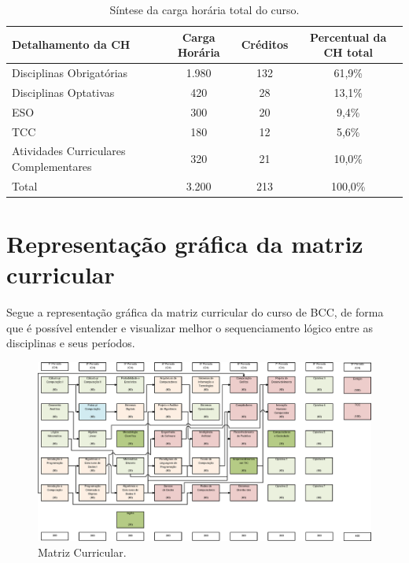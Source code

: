 \documentclass[
	12pt,				%
	openright,			%
  oneside,     %
	a4paper,			%
 hyphens,
	chapter=TITLE,		%
	english,			%
	french,				%
	spanish,			%
	brazil				%
	]{abntex2}
\begin{document}
  
  \begin{center}
    
    \begin{tiny}
      \begin{longtable}{lccc}
        \caption{\label{quadro:sintese-carga-horaria-total-do-curso}Síntese da carga horária total do curso.}\\
      \toprule
      \textbf{Detalhamento da CH} & \textbf{Carga Horária} & \textbf{Créditos} & \textbf{Percentual da CH total}\\
      \midrule
      Disciplinas Obrigatórias & 1.980 & 132 & 61,9\% \\ \midrule
      Disciplinas Optativas & 420 & 28 & 13,1\% \\ \midrule
      ESO & 300 & 20 & 9,4\% \\ \midrule
      TCC & 180 & 12 & 5,6\% \\ \midrule
      Atividades Curriculares Complementares & 320 & 21 & 10,0\% \\ \midrule
      Total & 3.200 & 213 & 100,0\% \\
  \bottomrule
  \end{longtable}
  \end{tiny}      
  \end{center}
  
  \section{Representação gráfica da matriz curricular}
  
  Segue a representação gráfica da matriz curricular do curso de BCC, de forma que é possível entender e visualizar melhor o sequenciamento lógico entre as disciplinas e seus períodos.
  
  \begin{figure}[!htb]
    \centering
    \caption{\label{fig:matriz-curricular}Matriz Curricular.}
    
    \includegraphics[width=\textwidth]{./images/matriz6.eps}
  \end{figure}
  
\end{document}
